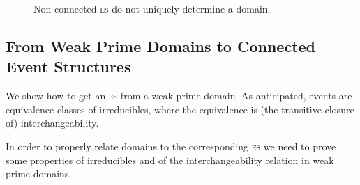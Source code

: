 \documentclass[conference]{IEEEtran}
\newcommand{\esabbr}{\textsc{es}}
\begin{document}
\begin{figure}
  \hfill
  \hfill
  \hfill$\mbox{}$
  \caption{Non-connected {\esabbr} do not uniquely determine a domain.}
  \label{fi:non-fusion}
\end{figure}

 


\subsection{From {Weak Prime Domains} to {Connected} Event Structures}
\label{ss:domain-to-es}
We show how to get an {\esabbr} from a weak prime domain. As {anticipated},
events are equivalence classes of irreducibles, where the equivalence
is (the transitive closure of) interchangeability.

In order to properly relate domains to the corresponding {\esabbr} we need to prove some properties of irreducibles and of the interchangeability relation in weak prime domains.

\end{document}
